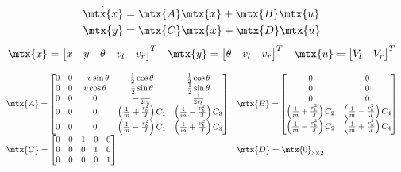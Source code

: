 \begin{theorem}
  \begin{align*}
    \dot{\mtx{x}} &= \mtx{A}\mtx{x} + \mtx{B}\mtx{u} \\
    \mtx{y} &= \mtx{C}\mtx{x} + \mtx{D}\mtx{u}
  \end{align*}
  \begin{equation*}
    \begin{array}{ccc}
      \mtx{x} =
      \begin{bmatrix}
        x & y & \theta & v_l & v_r
      \end{bmatrix}^T &
      \mtx{y} =
      \begin{bmatrix}
        \theta & v_l & v_r
      \end{bmatrix}^T &
      \mtx{u} =
      \begin{bmatrix}
        V_l & V_r
      \end{bmatrix}^T
    \end{array}
  \end{equation*}

  \begin{equation}
    \begin{array}{ll}
      \mtx{A} =
      \begin{bmatrix}
        0 & 0 & -v\sin\theta & \frac{1}{2}\cos\theta & \frac{1}{2}\cos\theta \\
        0 & 0 & v\cos\theta & \frac{1}{2}\sin\theta & \frac{1}{2}\sin\theta \\
        0 & 0 & 0 & -\frac{1}{2r_b} & \frac{1}{2r_b} \\
        0 & 0 & 0 & \left(\frac{1}{m} + \frac{r_b^2}{J}\right) C_1 &
          \left(\frac{1}{m} - \frac{r_b^2}{J}\right) C_3 \\
        0 & 0 & 0 & \left(\frac{1}{m} - \frac{r_b^2}{J}\right) C_1 &
          \left(\frac{1}{m} + \frac{r_b^2}{J}\right) C_3
      \end{bmatrix} &
      \mtx{B} =
      \begin{bmatrix}
        0 & 0 \\
        0 & 0 \\
        0 & 0 \\
        \left(\frac{1}{m} + \frac{r_b^2}{J}\right) C_2 &
        \left(\frac{1}{m} - \frac{r_b^2}{J}\right) C_4 \\
        \left(\frac{1}{m} - \frac{r_b^2}{J}\right) C_2 &
        \left(\frac{1}{m} + \frac{r_b^2}{J}\right) C_4
      \end{bmatrix} \\
      \mtx{C} =
      \begin{bmatrix}
        0 & 0 & 1 & 0 & 0 \\
        0 & 0 & 0 & 1 & 0 \\
        0 & 0 & 0 & 0 & 1
      \end{bmatrix} &
      \mtx{D} = \mtx{0}_{3 \times 2}
    \end{array}
  \end{equation}


\end{theorem}
